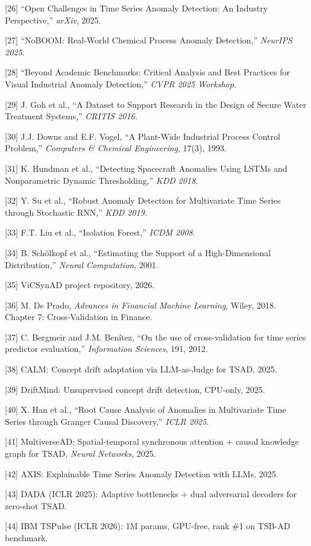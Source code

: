\documentclass[
]{article}
\begin{document}
{[}26{]} ``Open Challenges in Time Series Anomaly Detection: An Industry
Perspective,'' \emph{arXiv}, 2025.

{[}27{]} ``NoBOOM: Real-World Chemical Process Anomaly Detection,''
\emph{NeurIPS 2025}.

{[}28{]} ``Beyond Academic Benchmarks: Critical Analysis and Best
Practices for Visual Industrial Anomaly Detection,'' \emph{CVPR 2025
Workshop}.

{[}29{]} J. Goh et al., ``A Dataset to Support Research in the Design of
Secure Water Treatment Systems,'' \emph{CRITIS 2016}.

{[}30{]} J.J. Downs and E.F. Vogel, ``A Plant-Wide Industrial Process
Control Problem,'' \emph{Computers \& Chemical Engineering}, 17(3),
1993.

{[}31{]} K. Hundman et al., ``Detecting Spacecraft Anomalies Using LSTMs
and Nonparametric Dynamic Thresholding,'' \emph{KDD 2018}.

{[}32{]} Y. Su et al., ``Robust Anomaly Detection for Multivariate Time
Series through Stochastic RNN,'' \emph{KDD 2019}.

{[}33{]} F.T. Liu et al., ``Isolation Forest,'' \emph{ICDM 2008}.

{[}34{]} B. Schölkopf et al., ``Estimating the Support of a
High-Dimensional Distribution,'' \emph{Neural Computation}, 2001.

{[}35{]} ViCSynAD project repository, 2026.

{[}36{]} M. De Prado, \emph{Advances in Financial Machine Learning},
Wiley, 2018. Chapter 7: Cross-Validation in Finance.

{[}37{]} C. Bergmeir and J.M. Benítez, ``On the use of cross-validation
for time series predictor evaluation,'' \emph{Information Sciences},
191, 2012.

{[}38{]} CALM: Concept drift adaptation via LLM-as-Judge for TSAD, 2025.

{[}39{]} DriftMind: Unsupervised concept drift detection, CPU-only,
2025.

{[}40{]} X. Han et al., ``Root Cause Analysis of Anomalies in
Multivariate Time Series through Granger Causal Discovery,'' \emph{ICLR
2025}.

{[}41{]} MultiverseAD: Spatial-temporal synchronous attention + causal
knowledge graph for TSAD, \emph{Neural Networks}, 2025.

{[}42{]} AXIS: Explainable Time Series Anomaly Detection with LLMs,
2025.

{[}43{]} DADA (ICLR 2025): Adaptive bottlenecks + dual adversarial
decoders for zero-shot TSAD.

{[}44{]} IBM TSPulse (ICLR 2026): 1M params, GPU-free, rank \#1 on
TSB-AD benchmark.

\printbibliography
\end{document}
